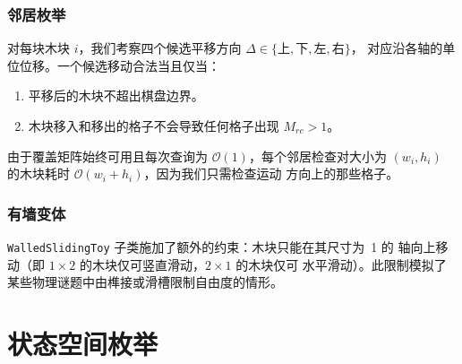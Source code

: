 \documentclass[11pt,a4paper]{report}
\begin{document}
\subsection{邻居枚举}
\label{sec:neighbour}
对每块木块 $i$，我们考察四个候选平移方向
$\Delta \in \{ \text{上}, \text{下}, \text{左}, \text{右} \}$，
对应沿各轴的单位位移。一个候选移动合法当且仅当：
\begin{enumerate}
    \item 平移后的木块不超出棋盘边界。
    \item 木块移入和移出的格子不会导致任何格子出现 $M_{rc} > 1$。
\end{enumerate}
由于覆盖矩阵始终可用且每次查询为 $\mathcal{O}(1)$，每个邻居检查对大小为
$(w_i, h_i)$ 的木块耗时 $\mathcal{O}(w_i + h_i)$，因为我们只需检查运动
方向上的那些格子。
\subsection{有墙变体}
\label{sec:walled}
\texttt{WalledSlidingToy} 子类施加了额外的约束：木块只能在其尺寸为~1 的
轴向上移动（即 $1\times2$ 的木块仅可竖直滑动，$2\times1$ 的木块仅可
水平滑动）。此限制模拟了某些物理谜题中由榫接或滑槽限制自由度的情形。
\chapter{状态空间枚举}
\label{ch:enumeration}
\end{document}
